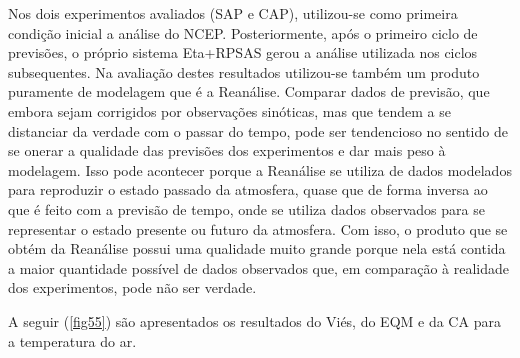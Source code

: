 Nos dois experimentos avaliados (SAP e CAP), utilizou-se como primeira condição inicial a análise do NCEP. Posteriormente, após o primeiro ciclo de previsões, o próprio sistema Eta+RPSAS gerou a análise utilizada nos ciclos subsequentes. Na avaliação destes resultados utilizou-se também um produto puramente de modelagem que é a Reanálise. Comparar dados de previsão, que embora sejam corrigidos por observações sinóticas, mas que tendem a se distanciar da verdade com o passar do tempo, pode ser tendencioso no sentido de se onerar a qualidade das previsões dos experimentos e dar mais peso à modelagem. Isso pode acontecer porque a Reanálise se utiliza de dados modelados para reproduzir o estado passado da atmosfera, quase que de forma inversa ao que é feito com a previsão de tempo, onde se utiliza dados observados para se representar o estado presente ou futuro da atmosfera. Com isso, o produto que se obtém da Reanálise possui uma qualidade muito grande porque nela está contida a maior quantidade possível de dados observados que, em comparação à realidade dos experimentos, pode não ser verdade.

A seguir (\autoref{fig55}) são apresentados os resultados do Viés, do EQM e da CA para a temperatura do ar.

\break

